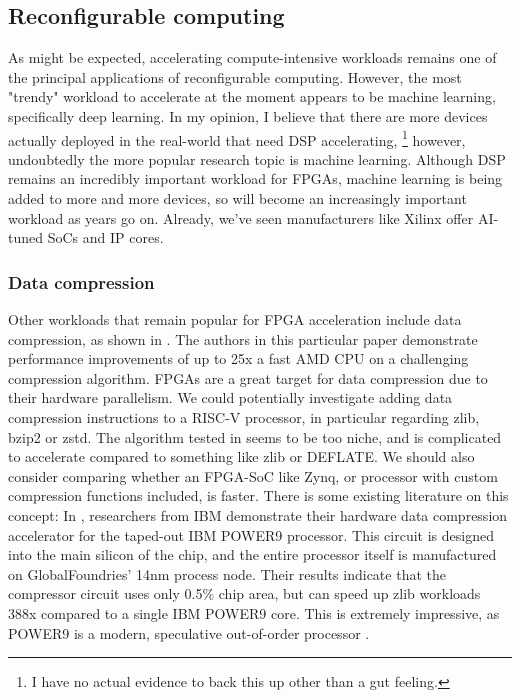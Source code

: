 \documentclass[12pt]{article}
\begin{document}
\subsection{Reconfigurable computing}
As might be expected, accelerating compute-intensive workloads remains one of the principal applications of
reconfigurable computing. However, the most "trendy" workload to accelerate at the moment appears to be
machine learning, specifically deep learning. In my opinion, I believe that there are more devices actually
deployed in the real-world that need DSP accelerating,
\footnote{I have no actual evidence to back this up other than a gut feeling.}
however, undoubtedly the more popular research topic
is machine learning. Although DSP remains an incredibly important workload for FPGAs, machine
learning is being added to more and more devices, so will become an increasingly important workload as
years go on. Already, we've seen manufacturers like Xilinx offer AI-tuned SoCs and IP cores.

\subsubsection{Data compression}

Other workloads that remain popular for FPGA acceleration include data compression, as shown in
\cite{Dongdong2022}. The authors in this particular paper demonstrate performance improvements of up to 25x a
fast AMD CPU on a challenging compression algorithm. FPGAs are a great target for data compression due to
their hardware parallelism. We could potentially investigate adding data compression instructions to a RISC-V
processor, in particular regarding zlib, bzip2 or zstd. The algorithm tested in \cite{Dongdong2022} seems to
be too niche, and is complicated to accelerate compared to something like zlib or DEFLATE. We should also
consider comparing whether an FPGA-SoC like Zynq, or processor with custom compression functions included, is
faster. There is some existing literature on this concept: In \cite{Abali2020}, researchers from IBM
demonstrate their hardware data compression accelerator for the taped-out IBM POWER9 processor. This circuit
is designed into the main silicon of the chip, and the entire processor itself is manufactured on
GlobalFoundries' 14nm process node. Their results indicate that the compressor circuit uses only 0.5\% chip 
area, but can speed up zlib workloads 388x compared to a single IBM POWER9 core. This is extremely impressive, 
as POWER9 is a modern, speculative out-of-order processor \cite{Sadasivam2017IBMPP}. 
\end{document}
